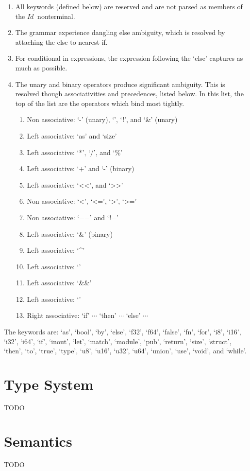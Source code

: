 \documentclass[letterpaper]{article}
\newcommand{\nonterminal}[1]{#1\ }
\begin{document}
\begin{enumerate}
  \item All keywords (defined below) are reserved and are not parsed as members of the $\nonterminal{Id}$ nonterminal.
  \item The grammar experience dangling else ambiguity, which is resolved by attaching the else to nearest if.
  \item For conditional in expressions, the expression following the `else' captures as much as possible.
  \item The unary and binary operators produce significant ambiguity.
    This is resolved though associativities and precedences, listed below.
    In this list, the top of the list are the operators which bind most tightly.
    \begin{enumerate}
      \item Non associative: `-' (unary), `\texttildelow', `!', and `\&' (unary)
      \item Left associative: `as' and `size'
      \item Left associative: `*', `/', and `\%'
      \item Left associative: `+' and `-' (binary)
      \item Left associative: `\textless\textless', and `\textgreater\textgreater'
      \item Non associative: `\textless', `\textless=', `\textgreater', `\textgreater='
      \item Non associative: `==' and `!='
      \item Left associative: `\&' (binary)
      \item Left associative: `\^{}'
      \item Left associative: `\textbar'
      \item Left associative: `\&\&'
      \item Left associative: `\textbar\textbar'
      \item Right associative: `if' $\cdots$ `then' $\cdots$ `else' $\cdots$
    \end{enumerate}
\end{enumerate}
%
The keywords are: `as', `bool', `by', `else', `f32', `f64', `false', `fn', `for', `i8', `i16', `i32', `i64', `if', `inout', `let', `match', `module', `pub', `return', `size', `struct', `then', `to', `true', `type', `u8', `u16', `u32', `u64', `union', `use', `void', and `while'.

\section{Type System}\label{sec:types}
TODO

\section{Semantics}\label{sec:semantics}
TODO
\end{document}
